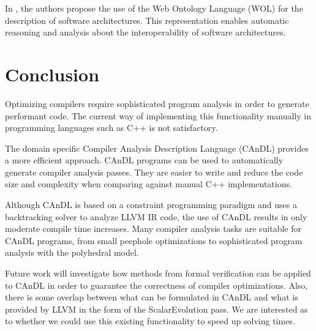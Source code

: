 In \cite{Yuan:2017:TOS:3101282.3101287}, the authors propose the
use of the Web Ontology Language (WOL) for the description of software
architectures.
This representation enables automatic reasoning and analysis about
the interoperability of software architectures.

\section{Conclusion}

Optimizing compilers require sophisticated program analysis in order to generate performant code.
The current way of implementing this functionality manually in programming languages such as C++ is not satisfactory.

The domain specific Compiler Analysis Description Language (CAnDL) provides a more efficient approach.
CAnDL programs can be used to automatically generate compiler analysis passes.
They are easier to write and reduce the code size and complexity when comparing against manual C++ implementations.

Although CAnDL is based on a constraint programming paradigm and uses a backtracking solver to analyze LLVM IR code, the use of CAnDL results in only moderate compile time increases.
Many compiler analysis tasks are suitable for CAnDL programs, from small peephole optimizations to sophisticated program analysis with the polyhedral model.

Future work will investigate how methods from formal verification can be applied to CAnDL in order to guarantee the correctness of compiler optimizations.
Also, there is some overlap between what can be formulated in CAnDL and what is provided by LLVM in the form of the ScalarEvolution pass.
We are interested as to whether we could use this existing functionality to speed up solving times.